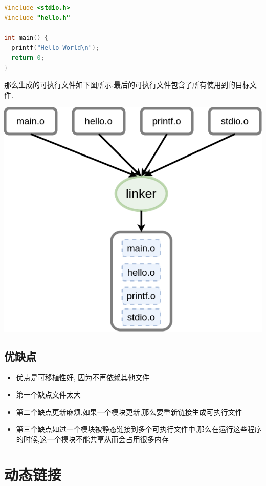 \documentclass{article}
\begin{document}
\begin{lstlisting}[language=C++, caption={main.cc}]
#include <stdio.h>
#include "hello.h"

int main() {
  printf("Hello World\n");
  return 0;
}
\end{lstlisting}
那么生成的可执行文件如下图所示.最后的可执行文件包含了所有使用到的目标文件. \par
\includegraphics[scale=0.6]{pic2.png} \par

\subsection{优缺点} 
\begin{itemize}
	\item 优点是可移植性好, 因为不再依赖其他文件
	\item 第一个缺点文件太大
	\item 第二个缺点更新麻烦,如果一个模块更新,那么要重新链接生成可执行文件
	\item 第三个缺点如过一个模块被静态链接到多个可执行文件中,那么在运行这些程序的时候,这一个模块不能共享从而会占用很多内存
\end{itemize}
\section{动态链接}
\end{document}
